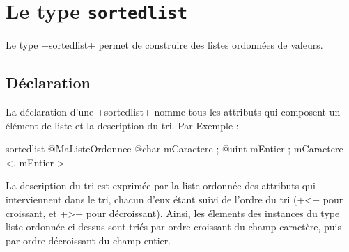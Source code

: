
\chapter{Le type \texttt{sortedlist}}

Le type \ggs+sortedlist+ permet de construire des listes ordonnées de valeurs.




\section{Déclaration}

La déclaration d'une \ggs+sortedlist+ nomme tous les attributs qui composent un élément de liste et la description du tri. Par Exemple :

\begin{galgas}
sortedlist @MaListeOrdonnee {
  @char mCaractere ;
  @uint mEntier ;
}{
  mCaractere <, mEntier >
}
\end{galgas}

La description du tri est exprimée par la liste ordonnée des attributs qui interviennent dans le tri, chacun d'eux étant suivi de l'ordre du tri (\ggs+<+ pour croissant, et \ggs+>+ pour décroissant). Ainsi, les élements des instances du type liste ordonnée ci-dessus sont triés par ordre croissant du champ caractère, puis par ordre décroissant du champ entier.

